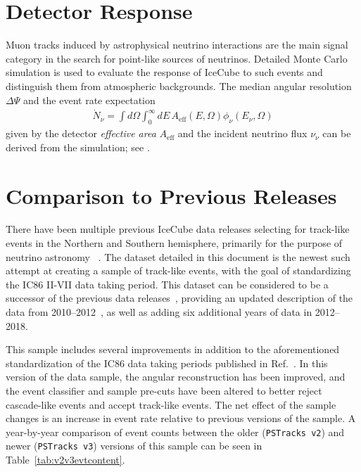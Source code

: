 \documentclass[aps,10pt,prd,twocolumn,floats,letterpaper,showpacs,nofootinbib,bibnotes,notitlepage,superscriptaddress,floatfix]{revtex4-1}
\newcommand{\MA}[1]{{\color{magenta}#1}}
\begin{document}

\section{Detector Response}\label{secIII}

Muon tracks induced by astrophysical neutrino interactions are the main signal category in the search for point-like sources of neutrinos. Detailed Monte Carlo simulation is used to evaluate the response of IceCube to such events and distinguish them from atmospheric backgrounds. The median angular resolution $\Delta\Psi$ and the event rate expectation
\begin{align}\label{eq:ev_rate}
\dot{N}_\nu=\int d\Omega\int_0^\infty dE\,A_\mathrm{eff}\left(E, \Omega\right) \phi_\nu\left(E_\nu,\Omega\right)
\end{align}
given by the detector \emph{effective area} $A_\mathrm{eff}$ and the incident neutrino flux $\nu_\nu$ can be derived from the simulation; see \cite{Aartsen:2016xlq}.

\section{Comparison to Previous Releases}\label{secIV}

There have been multiple previous IceCube data releases selecting for track-like events in the Northern and Southern hemisphere, primarily for the purpose of neutrino astronomy ~\cite{Abbasi:2010rd,Aartsen:2013uuv,IceCube:2018,IceCube:2019,IceCube:TXS2018}. The dataset detailed in this document is the newest such attempt at creating a sample of track-like events, with the goal of standardizing the IC86 II-VII data taking period. This dataset can be considered to be a successor of the previous data releases~\cite{IC40data,IC59data,IceCube:2018}, providing an updated description of the data from 2010--2012~\cite{IceCube:2018}, as well as adding six additional years of data in 2012--2018. 

This sample includes several improvements in addition to the aforementioned standardization of the IC86 data taking periods published in Ref.~\cite{IceCube:2018}. In this version of the data sample, the angular reconstruction has been improved, and the event classifier and sample pre-cuts have been altered to better reject cascade-like events and accept track-like events. The net effect of the sample changes is an increase in event rate relative to previous versions of the sample. A year-by-year comparison of event counts between the older \MA{({\tt PSTracks v2})} and newer \MA{({\tt PSTracks v3})} versions of this sample can be seen in Table~\ref{tab:v2v3evtcontent}.
\end{document}
